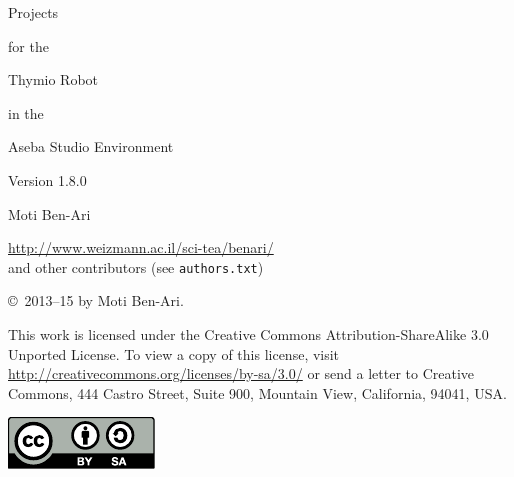 \thispagestyle{empty}

\begin{center}
\begin{bfseries}
\begin{LARGE}
Projects 

for the 

Thymio Robot

in the 

Aseba Studio Environment

\bigskip
\end{LARGE}

\begin{large}
Version 1.8.0
\end{large}

\begin{LARGE}
\bigskip\bigskip\bigskip\bigskip
Moti Ben-Ari
\end{LARGE}

\bigskip

\begin{large}
\href{http://www.weizmann.ac.il/sci-tea/benari/}{http://www.weizmann.ac.il/sci-tea/benari/}\\
\bigskip
and other contributors (see \texttt{authors.txt})
\end{large}
\end{bfseries}
\end{center}

\vfill

\begin{center}
\copyright{}\  2013--15 by Moti Ben-Ari. 
\end{center}

This work is licensed under the Creative Commons
Attribution-ShareAlike 3.0 Unported License. To view a copy
of this license, visit
\href{http://creativecommons.org/licenses/by-sa/3.0/}{http://creativecommons.org/licenses/by-sa/3.0/}
or send a letter to Creative Commons, 444 Castro Street, Suite 900,
Mountain View, California, 94041, USA.

\begin{center}
\includegraphics[width=.2\textwidth]{../images/by-sa}
\end{center}

\tableofcontents
\thispagestyle{empty}
